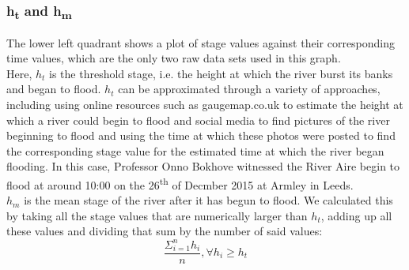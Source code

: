 \documentclass[11 pt, a4paper]{article}
\begin{document}
\subsubsection{h\textsubscript{t} and h\textsubscript{m}}
The lower left quadrant shows a plot of stage values against their corresponding time values, which are the only two raw data sets used in this graph. \\
Here, $h_t$ is the threshold stage, i.e. the height at which the river burst its banks and began to flood. $h_t$ can be approximated through a variety of approaches, including using online resources such as gaugemap.co.uk to estimate the height at which a river could begin to flood and social media to find pictures of the river beginning to flood and using the time at which these photos were posted to find the corresponding stage value for the estimated time at which the river began flooding. In this case, Professor Onno Bokhove witnessed the River Aire begin to flood at around 10:00 on the 26\textsuperscript{th} of Decmber 2015 at Armley in Leeds.\\
$h_m$ is the mean stage of the river after it has begun to flood. We calculated this by taking all the stage values that are numerically larger than $h_t$, adding up all these values and dividing that sum by the number of said values: \[\frac{\Sigma_{i=1}^{n} h_i}{n},\forall h_i\geq h_t\]\\
\end{document}
